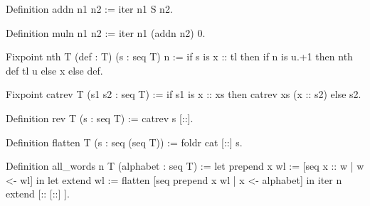 \begin{Answer}[ref=ex:iteradd]

\begin{coq}{}{}
Definition addn n1 n2 := iter n1 S n2.
\end{coq}

\end{Answer}

\begin{Answer}[ref=ex:itermul]

\begin{coq}{}{}
Definition muln n1 n2 := iter n1 (addn n2) 0.
\end{coq}

\end{Answer}

\begin{Answer}[ref=ex:nth]

\begin{coq}{}{}
Fixpoint nth T (def : T) (s : seq T) n :=
  if s is x :: tl then if n is u.+1 then nth def tl u else x else def.
\end{coq}

\end{Answer}

\begin{Answer}[ref=ex:rev]

\begin{coq}{}{}
Fixpoint catrev T (s1 s2 : seq T) :=
  if s1 is x :: xs then catrev xs (x :: s2) else s2.

Definition rev T (s : seq T) := catrev s [::].
\end{coq}

\end{Answer}


\begin{Answer}[ref=ex:flatten]

\begin{coq}{}{}
Definition flatten T (s : seq (seq T)) := foldr cat [::] s.
\end{coq}

\end{Answer}

\begin{Answer}[ref=ex:allwords]

\begin{coq}{}{}
Definition all_words n T (alphabet : seq T) :=
  let prepend x wl := [seq x :: w | w <- wl] in
  let extend wl := flatten [seq prepend x wl | x <- alphabet] in
  iter n extend [:: [::] ].
\end{coq}

\end{Answer}



